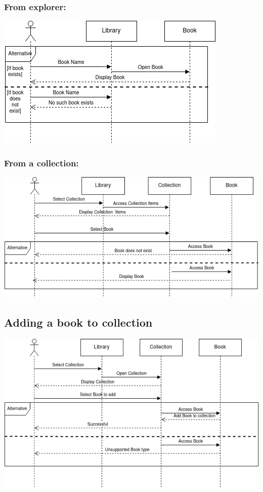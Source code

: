 \documentclass[answers]{exam}
\begin{document}
\subsubsection{From explorer:}
\begin{center}
\includegraphics[scale=0.75]{images/seq1a.png}
\end{center}
\subsubsection{From a collection:}
\begin{center}
\includegraphics[scale=0.75]{images/seq1b.png}
\end{center}
\newpage
\subsection{Adding a book to collection}
\begin{center}
\includegraphics[scale=0.75]{images/seq2.png}
\end{center}
\end{document}
